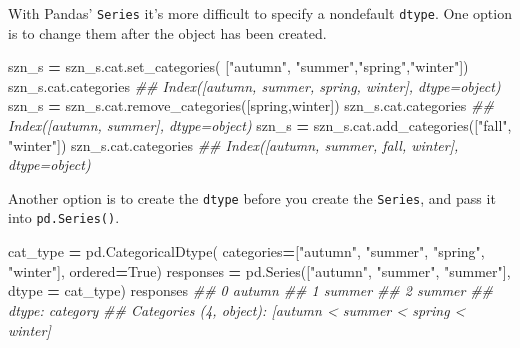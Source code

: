 \documentclass[
  12pt,
  krantz2]{krantz}
\makeatletter
\newenvironment{Shaded}{\begin{snugshade}}{\end{snugshade}}
\newcommand{\CommentTok}[1]{\textcolor[rgb]{0.37,0.37,0.37}{\textit{#1}}}
\newcommand{\NormalTok}[1]{#1}
\newcommand{\OperatorTok}[1]{\textcolor[rgb]{0.43,0.43,0.43}{\textbf{#1}}}
\newcommand{\StringTok}[1]{\textcolor[rgb]{0.5,0.5,0.5}{#1}}
\newcommand{\VariableTok}[1]{\textcolor[rgb]{0,0,0}{#1}}
\newenvironment{kframe}{%
\medskip{}
\setlength{\fboxsep}{.8em}
 \def\at@end@of@kframe{}%
 \ifinner\ifhmode%
  \def\at@end@of@kframe{\end{minipage}}%
  \begin{minipage}{\columnwidth}%
 \fi\fi%
 \def\FrameCommand##1{\hskip\@totalleftmargin \hskip-\fboxsep
 \colorbox{shadecolor}{##1}\hskip-\fboxsep
     \hskip-\linewidth \hskip-\@totalleftmargin \hskip\columnwidth}%
 \MakeFramed {\advance\hsize-\width
   \@totalleftmargin\z@ \linewidth\hsize
   \@setminipage}}%
 {\par\unskip\endMakeFramed%
 \at@end@of@kframe}
\renewenvironment{Shaded}{\begin{kframe}}{\end{kframe}}
\makeatother
\begin{document}
With Pandas' \texttt{Series} it's more difficult to specify a nondefault \texttt{dtype}. One option is to change them after the object has been created.

\begin{Shaded}
\begin{Highlighting}[]
\NormalTok{szn\_s }\OperatorTok{=}\NormalTok{ szn\_s.cat.set\_categories(}
\NormalTok{  [}\StringTok{"autumn"}\NormalTok{, }\StringTok{"summer"}\NormalTok{,}\StringTok{"spring"}\NormalTok{,}\StringTok{"winter"}\NormalTok{])}
\NormalTok{szn\_s.cat.categories}
\CommentTok{\#\# Index([\textquotesingle{}autumn\textquotesingle{}, \textquotesingle{}summer\textquotesingle{}, \textquotesingle{}spring\textquotesingle{}, \textquotesingle{}winter\textquotesingle{}], dtype=\textquotesingle{}object\textquotesingle{})}
\NormalTok{szn\_s }\OperatorTok{=}\NormalTok{ szn\_s.cat.remove\_categories([}\StringTok{\textquotesingle{}spring\textquotesingle{}}\NormalTok{,}\StringTok{\textquotesingle{}winter\textquotesingle{}}\NormalTok{])}
\NormalTok{szn\_s.cat.categories}
\CommentTok{\#\# Index([\textquotesingle{}autumn\textquotesingle{}, \textquotesingle{}summer\textquotesingle{}], dtype=\textquotesingle{}object\textquotesingle{})}
\NormalTok{szn\_s }\OperatorTok{=}\NormalTok{ szn\_s.cat.add\_categories([}\StringTok{"fall"}\NormalTok{, }\StringTok{"winter"}\NormalTok{])}
\NormalTok{szn\_s.cat.categories}
\CommentTok{\#\# Index([\textquotesingle{}autumn\textquotesingle{}, \textquotesingle{}summer\textquotesingle{}, \textquotesingle{}fall\textquotesingle{}, \textquotesingle{}winter\textquotesingle{}], dtype=\textquotesingle{}object\textquotesingle{})}
\end{Highlighting}
\end{Shaded}

Another option is to create the \texttt{dtype} before you create the \texttt{Series}, and pass it into \texttt{pd.Series()}.

\begin{Shaded}
\begin{Highlighting}[]
\NormalTok{cat\_type }\OperatorTok{=}\NormalTok{ pd.CategoricalDtype(}
\NormalTok{                  categories}\OperatorTok{=}\NormalTok{[}\StringTok{"autumn"}\NormalTok{, }\StringTok{"summer"}\NormalTok{, }\StringTok{"spring"}\NormalTok{, }\StringTok{"winter"}\NormalTok{],}
\NormalTok{                  ordered}\OperatorTok{=}\VariableTok{True}\NormalTok{)}
\NormalTok{responses }\OperatorTok{=}\NormalTok{ pd.Series([}\StringTok{"autumn"}\NormalTok{, }\StringTok{"summer"}\NormalTok{, }\StringTok{"summer"}\NormalTok{], }
\NormalTok{                      dtype }\OperatorTok{=}\NormalTok{ cat\_type)}
\NormalTok{responses}
\CommentTok{\#\# 0    autumn}
\CommentTok{\#\# 1    summer}
\CommentTok{\#\# 2    summer}
\CommentTok{\#\# dtype: category}
\CommentTok{\#\# Categories (4, object): [\textquotesingle{}autumn\textquotesingle{} \textless{} \textquotesingle{}summer\textquotesingle{} \textless{} \textquotesingle{}spring\textquotesingle{} \textless{} \textquotesingle{}winter\textquotesingle{}]}
\end{Highlighting}
\end{Shaded}
\end{document}
